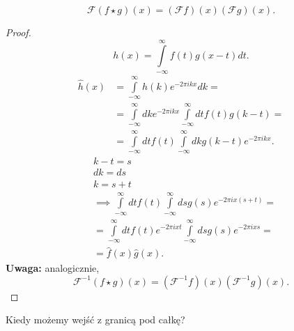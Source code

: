 \documentclass[../main.tex]{subfiles}
\begin{document}
    \begin{stw}
    \[
        \mathcal{F}\left( f\star g \right) (x) = \left( \mathcal{F}f \right) (x) \left( \mathcal{F}g \right) (x)
    .\]
    \end{stw}
\begin{proof}
    \[
        h(x) = \int\limits_{-\infty}^{\infty} f(t)g(x-t)dt
    .\]
\begin{align*}
    \hat{h}(x) &= \int\limits_{-\infty}^{\infty} h(k)e^{-2\pi i kx}dk = \\
    &= \int\limits_{-\infty}^{\infty} dk e^{-2\pi i kx}\int\limits_{-\infty}^{\infty} dt f(t)g(k-t) = \\
    &= \int\limits_{-\infty}^{\infty} dt f(t) \int\limits_{-\infty}^{\infty} dk g(k-t) e^{-2\pi i kx}
    .\end{align*}
    \begin{align*}
    &k-t = s\\
    &dk = ds\\
    &k = s+t\\
    &\implies\int\limits_{-\infty}^{\infty} dt f(t)\int\limits_{-\infty}^{\infty} ds g(s) e^{-2\pi i x(s+t)} = \\
    &= \int\limits_{-\infty}^{\infty} dt f(t) e^{-2\pi i xt} \int\limits_{-\infty}^{\infty} ds g(s) e^{-2\pi i xs} = \\
    &= \hat{f}(x) \hat{g}(x)
.\end{align*}
\textbf{Uwaga:} analogicznie,
\[
    \mathcal{F}^{-1}\left( f\star g \right) (x) = \left( \mathcal{F}^{-1}f \right) (x) \left( \mathcal{F}^{-1}g \right) (x)
.\]
\end{proof}
\begin{pytanie}
    Kiedy możemy wejść z granicą pod całkę?
\end{pytanie}
\end{document}
